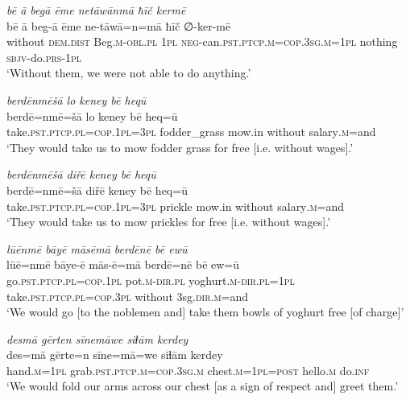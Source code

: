 \ea \label{RE.64}
\textit{bē ā begā ēme netāwānmā ħīč kermē} \\ 
\gll bē ā beg-ā ēme ne-tāwā=n=mā ħīč ∅-ker-mē \\ 
 without \textsc{dem.dist} Beg\textsc{.m}\textsc{-obl}\textsc{.pl} \textsc{1pl} \textsc{neg-}can\textsc{.pst}\textsc{.ptcp}\textsc{.m}\textsc{=cop}\textsc{.3sg}\textsc{.m}\textsc{=\textsc{1pl}} nothing \textsc{sbjv-}do\textsc{.prs}\textsc{-\textsc{1pl}} \\ 
\glt `Without them, we were not able to do anything.'
\z 
 
\ea \label{RE.65}
\textit{berdēnmēšā lo keney bē heqū} \\ 
\gll berdē=nmē=šā lo keney bē heq=ū \\ 
 take\textsc{.pst}\textsc{.ptcp}\textsc{.pl}\textsc{=cop}\textsc{.\textsc{1pl}}\textsc{=3pl} fodder\_grass mow.in without salary\textsc{.m}=and \\ 
\glt `They would take us to mow fodder grass for free [i.e. without wages].'
\z 
 
\ea \label{RE.66}
\textit{berdēnmēšā diřē keney bē heqū} \\ 
\gll berdē=nmē=šā diřē keney bē heq=ū \\ 
 take\textsc{.pst}\textsc{.ptcp}\textsc{.pl}\textsc{=cop}\textsc{.\textsc{1pl}}\textsc{=3pl} prickle mow.in without salary\textsc{.m}=and \\ 
\glt `They would take us to mow prickles for free [i.e. without wages].'
\z 
 
\ea \label{RE.67}
\textit{lūēnmē bāyē māsēmā berdēnē bē ewū} \\ 
\gll lūē=nmē bāye-ē mās-ē=mā berdē=nē bē ew=ū \\ 
 go\textsc{.pst}\textsc{.ptcp}\textsc{.pl}\textsc{=cop}\textsc{.\textsc{1pl}} pot\textsc{.m}\textsc{-dir}\textsc{.pl} yoghurt\textsc{.m}\textsc{-dir}\textsc{.pl}\textsc{=\textsc{1pl}} take\textsc{.pst}\textsc{.ptcp}\textsc{.pl}\textsc{=cop}\textsc{.3pl} without 3sg\textsc{.dir}\textsc{.m}=and \\ 
\glt `We would go [to the noblemen and] take them bowls of yoghurt free [of charge]'
\z 
 
\ea \label{RE.68}
\textit{desmā gērten sīnemāwe siɫām kerdey} \\ 
\gll des=mā gērte=n sīne=mā=we siɫām kerdey \\ 
 hand\textsc{.m}\textsc{=\textsc{1pl}} grab\textsc{.pst}\textsc{.ptcp}\textsc{.m}\textsc{=cop}\textsc{.3sg}\textsc{.m} chest\textsc{.m}\textsc{=\textsc{1pl}}\textsc{=\textsc{post}} hello\textsc{.m} do\textsc{.inf} \\ 
\glt `We would fold our arms across our chest [as a sign of respect and] greet them.'
\z 
 
